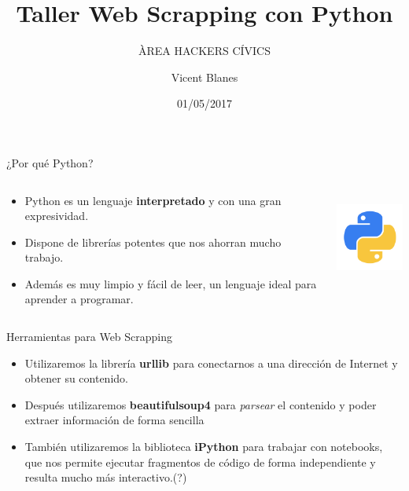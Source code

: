 \documentclass{beamer}
\title{Taller Web Scrapping con Python}
\subtitle{ÀREA HACKERS CÍVICS}
\author{Vicent Blanes}
\date{01/05/2017}
\begin{document}
	\begin{frame}
		\titlepage
	\end{frame}

	\begin{frame}{¿Por qué Python?}
		\begin{columns}[T]
			\begin{column}[T]{8cm} 
				\begin{itemize}  
					\item Python es un lenguaje \textbf{interpretado} y con una gran expresividad.
					\item Dispone de librerías potentes que nos ahorran mucho trabajo.
					\item Además es muy limpio y fácil de leer, un lenguaje ideal para aprender a programar.
				\end{itemize}
			\end{column}
		
			\begin{column}[T]{5cm}
				\includegraphics[height=3cm]{python.png}
			\end{column}
		\end{columns}
	\end{frame}
	\begin{frame}{Herramientas para Web Scrapping}
		\begin{itemize}
			\item Utilizaremos la librería \textbf{urllib} para conectarnos a una dirección de Internet y obtener su contenido.
			\item Después utilizaremos \textbf{beautifulsoup4} para \textit{parsear} el contenido y poder extraer información de forma
			sencilla
			\item También utilizaremos la biblioteca \textbf{iPython} para trabajar con notebooks, que nos permite ejecutar fragmentos de 
			código de forma independiente y resulta mucho más interactivo.(?)
		\end{itemize}
	\end{frame}
\end{document}
